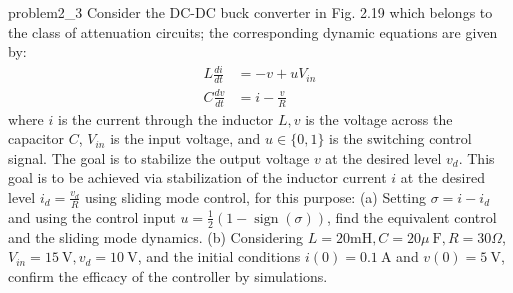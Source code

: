 
\begin{problem}{2.3}{problem2_3}
Consider the DC-DC buck converter in Fig. 2.19 which belongs to the class of attenuation circuits; the corresponding dynamic equations are given by:
$$
	\begin{aligned}
		L \frac{d i}{d t} & =-v+u V_{i n}  \\
		C \frac{d v}{d t} & =i-\frac{v}{R}
	\end{aligned}
$$
where $i$ is the current through the inductor $L, v$ is the voltage across the capacitor $C$, $V_{i n}$ is the input voltage, and $u \in\{0,1\}$ is the switching control signal. The goal is to stabilize the output voltage $v$ at the desired level $v_d$. This goal is to be achieved via stabilization of the inductor current $i$ at the desired level $i_d=\frac{v_d}{R}$ using sliding mode control, for this purpose:
(a) Setting $\sigma=i-i_d$ and using the control input $u=\frac{1}{2}(1-\operatorname{sign}(\sigma))$, find the equivalent control and the sliding mode dynamics.
(b) Considering $L=20 \mathrm{mH}, C=20 \mu \mathrm{~F}, R=30 \Omega$, $V_{i n}=15 \mathrm{~V}, v_d=10 \mathrm{~V}$, and the initial conditions $i(0)=0.1 \mathrm{~A}$ and $v(0)=5 \mathrm{~V}$, confirm the efficacy of the controller by simulations.
\end{problem}

